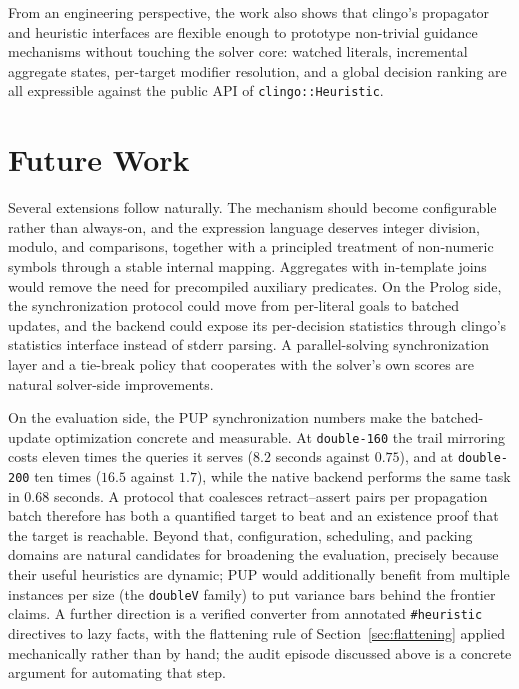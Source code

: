 From an engineering perspective, the work also shows that clingo's propagator and heuristic interfaces are flexible enough to prototype non-trivial guidance mechanisms without touching the solver core: watched literals, incremental aggregate states, per-target modifier resolution, and a global decision ranking are all expressible against the public API of \texttt{clingo::Heuristic}.

\section{Future Work}

Several extensions follow naturally. The mechanism should become configurable rather than always-on, and the expression language deserves integer division, modulo, and comparisons, together with a principled treatment of non-numeric symbols through a stable internal mapping. Aggregates with in-template joins would remove the need for precompiled auxiliary predicates. On the Prolog side, the synchronization protocol could move from per-literal goals to batched updates, and the backend could expose its per-decision statistics through clingo's statistics interface instead of stderr parsing. A parallel-solving synchronization layer and a tie-break policy that cooperates with the solver's own scores are natural solver-side improvements.

On the evaluation side, the PUP synchronization numbers make the batched-update optimization concrete and measurable. At \texttt{double-160} the trail mirroring costs eleven times the queries it serves ($8.2$ seconds against $0.75$), and at \texttt{double-200} ten times ($16.5$ against $1.7$), while the native backend performs the same task in $0.68$ seconds. A protocol that coalesces retract--assert pairs per propagation batch therefore has both a quantified target to beat and an existence proof that the target is reachable. Beyond that, configuration, scheduling, and packing domains are natural candidates for broadening the evaluation, precisely because their useful heuristics are dynamic; PUP would additionally benefit from multiple instances per size (the \texttt{doubleV} family) to put variance bars behind the frontier claims. A further direction is a verified converter from annotated \texttt{\#heuristic} directives to lazy facts, with the flattening rule of Section~\ref{sec:flattening} applied mechanically rather than by hand; the audit episode discussed above is a concrete argument for automating that step.

